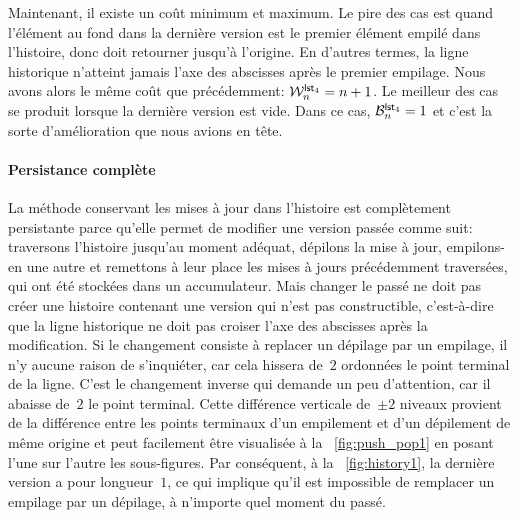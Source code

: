 Maintenant, il existe un coût minimum et maximum. Le pire des cas est
quand l'élément au fond dans la dernière version est le premier
élément empilé dans l'histoire, donc
 doit retourner jusqu'à
l'origine. En d'autres termes, la ligne historique n'atteint jamais
l'axe des abscisses après le premier empilage. Nous avons alors le
même coût que précédemment: \(\W{\fun{lst}_4}{n} = n +
1\).  Le meilleur des cas se produit lorsque la dernière version est vide. Dans ce cas, \(\B{\fun{lst}_4}{n} =
1\) et c'est la sorte d'amélioration que nous avions en tête.


\paragraph{Persistance complète}

La méthode conservant les mises à jour dans l'histoire est
complètement persistante parce qu'elle permet de modifier une version
passée comme suit: traversons l'histoire jusqu'au moment adéquat,
dépilons la mise à jour, empilons-en une autre et remettons à leur
place les mises à jours précédemment traversées, qui ont été stockées
dans un accumulateur. Mais changer le passé ne doit pas créer une
histoire contenant une version qui n'est pas constructible,
c'est-à-dire que la ligne historique ne doit pas croiser l'axe des
abscisses après la modification. Si le changement consiste à replacer
un dépilage par un empilage, il n'y aucune raison de s'inquiéter, car
cela hissera de~\(2\) ordonnées le point terminal de la ligne. C'est
le changement inverse qui demande un peu d'attention, car il abaisse
de~\(2\) le point terminal. Cette différence verticale de~\(\pm 2\)
niveaux provient de la différence entre les points terminaux d'un
empilement et d'un dépilement de même origine et peut facilement être
visualisée à la \fig~\vref{fig:push_pop1} en posant l'une sur l'autre
les sous-figures. Par conséquent, à la \fig~\ref{fig:history1}, la
dernière version a pour longueur~\(1\), ce qui implique qu'il est
impossible de remplacer un empilage par un dépilage, à n'importe quel
moment du passé.

